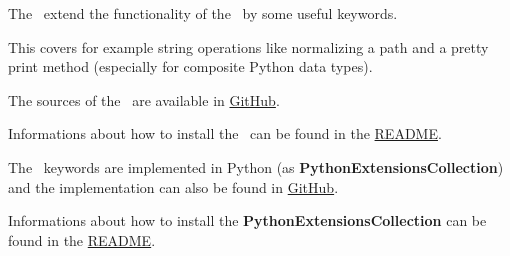 %



%

The \pkg\ extend the functionality of the \rfwcore\ by some useful keywords.

This covers for example string operations like normalizing a path and a pretty print method (especially for composite Python data types).

The sources of the \pkg\ are available in \href{https://github.com/test-fullautomation/robotframework-extensions-collection}{GitHub}.

Informations about how to install the \pkg\ can be found in the \href{https://github.com/test-fullautomation/robotframework-extensions-collection/blob/develop/README.rst}{README}.

The \pkg\ keywords are implemented in Python (as \textbf{PythonExtensionsCollection}) and the implementation can also be found in
\href{https://github.com/test-fullautomation/python-extensions-collection}{GitHub}.

Informations about how to install the \textbf{PythonExtensionsCollection} can be found in the
\href{https://github.com/test-fullautomation/python-extensions-collection/blob/develop/README.rst}{README}.

